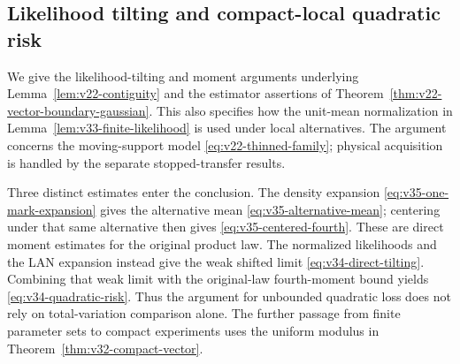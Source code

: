 \subsection{Likelihood tilting and compact-local quadratic risk}
\label{subsec:v34-tilting-moments}

We give the likelihood-tilting and moment arguments underlying
Lemma~\ref{lem:v22-contiguity} and the estimator assertions of
Theorem~\ref{thm:v22-vector-boundary-gaussian}.  This also specifies how the
unit-mean normalization in Lemma~\ref{lem:v33-finite-likelihood} is used
under local alternatives.  The argument concerns the moving-support model
\eqref{eq:v22-thinned-family}; physical acquisition is handled by the
separate stopped-transfer results.

Three distinct estimates enter the conclusion.  The density expansion
\eqref{eq:v35-one-mark-expansion} gives the alternative mean
\eqref{eq:v35-alternative-mean}; centering under that same alternative
then gives \eqref{eq:v35-centered-fourth}.  These are direct moment
estimates for the original product law.  The normalized likelihoods and
the LAN expansion instead give the weak shifted limit
\eqref{eq:v34-direct-tilting}.  Combining that weak limit with the
original-law fourth-moment bound yields
\eqref{eq:v34-quadratic-risk}.  Thus the argument for unbounded quadratic
loss does not rely on total-variation comparison alone.  The further
passage from finite parameter sets to compact experiments uses the
uniform modulus in Theorem~\ref{thm:v32-compact-vector}.

